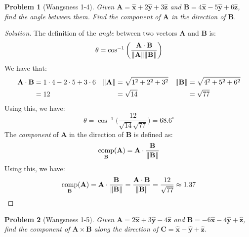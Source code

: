 \documentclass{article}
\theoremstyle{mystyle}
\newtheorem{problem}{Problem}[section]
\DeclareMathOperator{\comp}{comp}
\begin{document}
\begin{problem}[Wangsness 1-4]
Given $\mathbf{A} = \hat{\mathbf{x}}+2\hat{\mathbf{y}}+3\hat{\mathbf{z}}$ and $\mathbf{B}=4\hat{\mathbf{x}}-5\hat{\mathbf{y}}+6\hat{\mathbf{z}}$, find the angle between them. Find the component of $\mathbf{A}$ in the direction of $\mathbf{B}$.
\end{problem}
\begin{proof}[Solution]
The definition of the \textit{angle} between two vectors $\mathbf{A}$ and $\mathbf{B}$ is:
\begin{equation*}
    \theta = \cos^{-1}\bigg(\frac{\mathbf{A}\cdot\mathbf{B}}{\norm{\mathbf{A}}\norm{\mathbf{B}}}\bigg)
\end{equation*}
We have that:
\begin{align*}
    \mathbf{A}\cdot\mathbf{B} &=1\cdot4-2\cdot5+3\cdot6 &\norm{\mathbf{A}}&=\sqrt{1^{2}+2^{2}+3^{2}}&\norm{\mathbf{B}}&=\sqrt{4^{2}+5^{2}+6^{2}}\\
    &=12& &=\sqrt{14}& &=\sqrt{77}\\
\end{align*}
Using this, we have:
\begin{equation*}
    \theta=\cos^{-1}\bigg(\frac{12}{\sqrt{14}{\sqrt{77}}}\bigg)=68.6^{\circ}
\end{equation*}
The \textit{component} of $\mathbf{A}$ in the direction of $\mathbf{B}$ is defined as:
\begin{equation*}
    \comp_{\mathbf{B}}(\mathbf{A})=\mathbf{A}\cdot\frac{\mathbf{B}}{\norm{\mathbf{B}}}
\end{equation*}
Using this, we have:
\begin{equation*}
    \comp_{\mathbf{B}}(\mathbf{A})=\mathbf{A}\cdot\frac{\mathbf{B}}{\norm{\mathbf{B}}}=\frac{\mathbf{A}\cdot\mathbf{B}}{\norm{\mathbf{B}}}= \frac{12}{\sqrt{77}} \approx 1.37
\end{equation*}
\end{proof}
\begin{problem}[Wangsness 1-5]
Given $\mathbf{A} = 2\hat{\mathbf{x}}+3\hat{\mathbf{y}}-4\hat{\mathbf{z}}$ and $\mathbf{B}=-6\hat{\mathbf{x}}-4\hat{\mathbf{y}}+\hat{\mathbf{z}}$, find the component of $\mathbf{A}\times\mathbf{B}$ along the direction of $\mathbf{C}=\hat{\mathbf{x}}-\hat{\mathbf{y}}+\hat{\mathbf{z}}$.
\end{problem}
\end{document}
